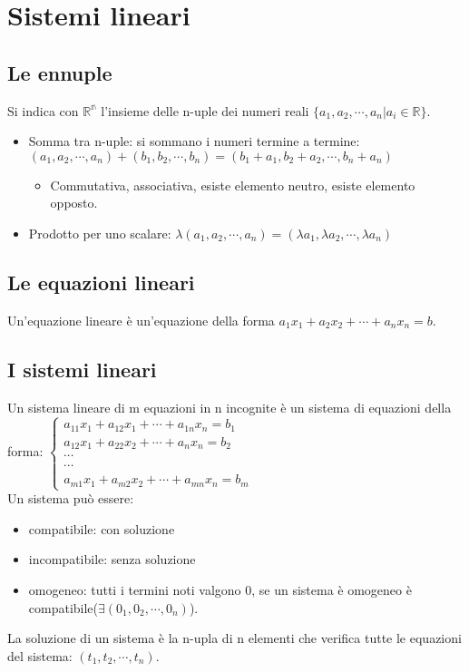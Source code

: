 \chapter{Sistemi lineari}
\section{Le ennuple}
Si indica con $\mathbb{R^n}$ l'insieme delle n-uple dei numeri reali $\{a_1, a_2, \cdots, a_n|a_i\in\mathbb{R}\}$.
\begin{itemize}
\subsection{Operazioni tra ennuple}
\item Somma tra n-uple: si sommano i numeri termine a termine: $(a_1, a_2, \cdots, a_n)+(b_1, b_2, \cdots, b_n)=(b_1+a_1, b_2+a_2, \cdots, b_n+a_n)$
\begin{itemize}
\item Commutativa, associativa, esiste elemento neutro, esiste elemento opposto.
\end{itemize}
\item Prodotto per uno scalare: $\lambda(a_1, a_2, \cdots, a_n)=(\lambda a_1, \lambda a_2, \cdots,\lambda a_n)$
\end{itemize}
\section{Le equazioni lineari}
Un'equazione lineare \`e un'equazione della forma $a_1x_1+a_2x_2+\cdots+a_nx_n=b$.
\section{I sistemi lineari}
Un sistema lineare di m equazioni in n incognite \`e un sistema di equazioni della forma:
$\begin{cases}a_{11}x_1+a_{12}x_1+\cdots+a_{1n}x_n=b_1\\a_{12}x_1+a_{22}x_2+\cdots+a_nx_n=b_2\\ \cdots\\ \cdots \\ a_{m1}x_1+a_{m2}x_2+\cdots+a_{mn}x_n=b_m \end{cases}$\\
Un sistema pu\`o essere:
\begin{itemize}
\item compatibile: con soluzione
\item incompatibile: senza soluzione
\item omogeneo: tutti i termini noti valgono 0, se un sistema \`e omogeneo \`e compatibile($\exists (0_1, 0_2, \cdots, 0_n)$).
\end{itemize}
La soluzione di un sistema \`e la n-upla di n elementi che verifica tutte le equazioni del sistema: $(t_1, t_2, \cdots, t_n)$.
